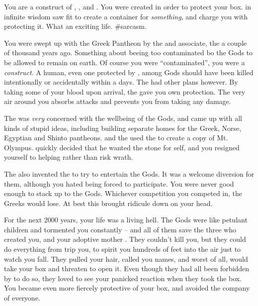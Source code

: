 \documentclass[char]{guardians}
\begin{document}
\name{\cPandora{}}

You are a construct of \cZeus{}, \cAthena{}, and \cHephaestus{}. You were created in order to protect your box.  \cZeus{} in \cZeus{\their} infinite wisdom saw fit to create a container for \emph{something}, and charge you with protecting it. What an exciting life. \#sarcasm.

You were swept up with the Greek Pantheon by the \cWarden{} and \cWarden{\their} associate, the \cCaretaker{} a couple of thousand years ago. Something about beeing too contaminated bo the Gods to be allowed to remain on earth. Of course you were ``contaminated'', you were a \emph{construct}. A human, even one protected by \cZeus{}, among Gods should have been killed intentionally or accidentally within a days. The \cWarden{} had other plans however. By taking some of your blood upon arrival, the \cWarden{} gave you \cWarden{\their} own protection. The very air around you absorbs attacks and prevents you from taking any damage.

The \cCaretaker{} was \emph{very} concerned with the wellbeing of the Gods, and came up with all kinds of stupid ideas, including building separate homes for the Greek, Norse, Egyptian and Shinto pantheons. \cCaretaker{\They} and the \cWarden{} used the \stone{} to create a copy of Mt. Olympus. \cZeus{} quickly decided that he wanted the stone for \cZeus{\them}self, and you resigned yourself to helping rather than risk \cZeus{\their} wrath.

The \cCaretaker{} also invented the \pGames{} to try to entertain the Gods. It was a welcome diversion for them, although you hated being forced to participate. You were never good enough to stack up to the Gods. Whichever competition you competed in, the Greeks would lose. At best this brought ridicule down on your head.

For the next 2000 years, your life was a living hell. The Gods were like petulant children and tormented you constantly -- and all of them save the three who created you, and your adoptive mother \cHera{}. They couldn't kill you, but they could do everything from trip you, to spirit you hundreds of feet into the air just to watch you fall.  They pulled your hair, called you names, and worst of all, would take your box and threaten to open it.  Even though they had all been forbidden by \cZeus{} to do so, they loved to see your panicked reaction when they took the box. You became even more fiercely protective of your box, and avoided the company of everyone. 
\end{document}
